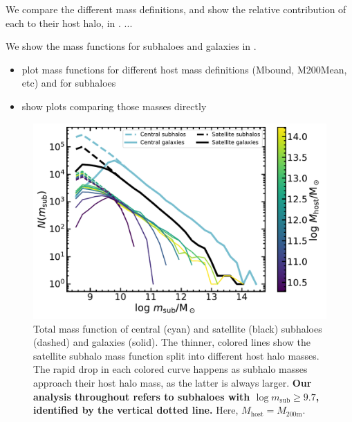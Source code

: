 \documentclass[usenatbib,fleqn]{mnras}
\newcommand{\comment}[1]{\textbf{\color{magenta} #1}}
\newcommand{\eagle}{EAGLE}
\newcommand{\msub}{m_\mathrm{sub}}
\newcommand{\Mhost}{M_\mathrm{host}}
\newcommand{\Msun}{\mathrm{M}_\odot}
\newcommand{\mtwo}{M_\mathrm{200m}}
\newcommand{\hMsun}{h^{-1}\,\Msun}
\begin{document}
We compare the different mass definitions, and show the relative contribution of each to their host halo, in .  ...

We show the mass functions for subhaloes and galaxies in .

\begin{itemize}
  \item plot mass functions for different host mass definitions (Mbound, M200Mean, etc) and for subhaloes
  \item show plots comparing those masses directly
\end{itemize}

\begin{figure}
  \centerline{\includegraphics[width=\linewidth]{nmsub.pdf}}
  \caption{Total mass function of central (cyan) and satellite (black) subhaloes (dashed) and galaxies (solid). The thinner, colored lines show the satellite subhalo mass function split into different host halo masses. The rapid drop in each colored curve happens as subhalo masses approach their host halo mass, as the latter is always larger. \comment{Our analysis throughout refers to subhaloes with $\log\msub\geq9.7$, identified by the vertical dotted line.} Here, $\Mhost=\mtwo$.}
  \label{f:massfunction}
\end{figure}


\end{document}
